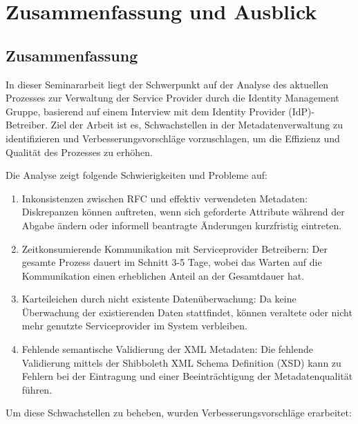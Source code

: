 \section{Zusammenfassung und Ausblick}\label{sec:summary}
\subsection{Zusammenfassung}\label{subsec:summary}
In dieser Seminararbeit liegt der Schwerpunkt auf der Analyse des aktuellen Prozesses zur Verwaltung der Service Provider durch die Identity Management Gruppe, basierend auf einem Interview mit dem Identity Provider (IdP)-Betreiber.
Ziel der Arbeit ist es, Schwachstellen in der Metadatenverwaltung zu identifizieren und Verbesserungsvorschläge vorzuschlagen, um die Effizienz und Qualität des Prozesses zu erhöhen.

Die Analyse zeigt folgende Schwierigkeiten und Probleme auf:

\begin{enumerate}
    \item Inkonsistenzen zwischen RFC und effektiv verwendeten Metadaten: Diskrepanzen können auftreten, wenn sich geforderte Attribute während der Abgabe ändern oder informell beantragte Änderungen kurzfristig eintreten.
    \item Zeitkonsumierende Kommunikation mit Serviceprovider Betreibern: Der gesamte Prozess dauert im Schnitt 3-5 Tage, wobei das Warten auf die Kommunikation einen erheblichen Anteil an der Gesamtdauer hat.
    \item Karteileichen durch nicht existente Datenüberwachung: Da keine Überwachung der existierenden Daten stattfindet, können veraltete oder nicht mehr genutzte Serviceprovider im System verbleiben.
    \item Fehlende semantische Validierung der XML Metadaten: Die fehlende Validierung mittels der Shibboleth XML Schema Definition (XSD) kann zu Fehlern bei der Eintragung und einer Beeinträchtigung der Metadatenqualität führen.
\end{enumerate}

Um diese Schwachstellen zu beheben, wurden Verbesserungsvorschläge erarbeitet:

